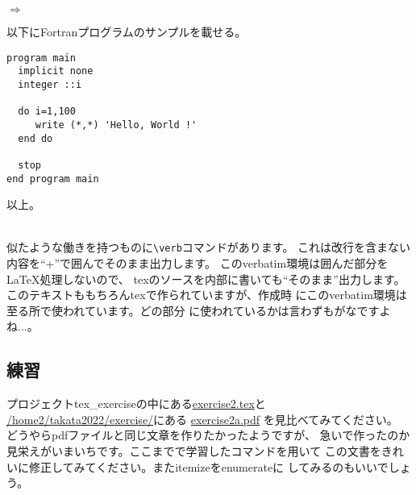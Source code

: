$\Rightarrow$
\begin{minipage}{.50\textwidth}
\begin{shadebox}
以下にFortranプログラムのサンプルを載せる。
\begin{verbatim}
program main
  implicit none
  integer ::i

  do i=1,100
     write (*,*) 'Hello, World !'
  end do

  stop
end program main
\end{verbatim}
以上。
\end{shadebox}
\end{minipage}
\vspace*{1mm}\\
似たような働きを持つものに\verb+\verb+コマンドがあります。
これは改行を含まない内容を``+''で囲んでそのまま出力します。
このverbatim環境は囲んだ部分を{\LaTeX}処理しないので、
texのソースを内部に書いても``そのまま''出力します。
このテキストももちろんtexで作られていますが、作成時
にこのverbatim環境は至る所で使われています。どの部分
に使われているかは言わずもがなですよね...。


\subsection{練習}
プロジェクトtex\_exerciseの中にある\underline{exercise2.tex}と
\underline{/home2/takata2022/exercise/}にある
\underline{exercise2a.pdf}
を見比べてみてください。
どうやらpdfファイルと同じ文章を作りたかったようですが、
急いで作ったのか見栄えがいまいちです。ここまでで学習したコマンドを用いて
この文書をきれいに修正してみてください。またitemizeをenumerateに
してみるのもいいでしょう。

\pagebreak
